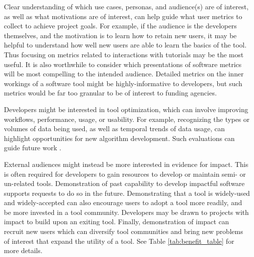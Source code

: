 \documentclass{article}
\begin{document}
Clear understanding of which use cases, personas, and audience(s) are of interest, as well as what motivations are of interest, can help guide what user metrics to collect to achieve project goals. For example, if the audience is the developers themselves, and the motivation is to learn how to retain new users, it may be helpful to understand how well new users are able to learn the basics of the tool. Thus focusing on metrics related to interactions with tutorials may be the most useful. It is also worthwhile to consider which presentations of software metrics will be most compelling to the intended audience. Detailed metrics on the inner workings of a software tool might be highly-informative to developers, but such metrics would be far too granular to be of interest to funding agencies.

Developers might be interested in tool optimization, which can involve improving workflows, performance, usage, or usability. For example, recognizing the types or volumes of data being used, as well as temporal trends of data usage, can highlight opportunities for new algorithm development. Such evaluations can guide future work \cite{fenton2014software}.

External audiences might instead be more interested in evidence for impact. This is often required for developers to gain resources to develop or maintain semi- or un-related tools. Demonstration of past capability to develop impactful software supports requests to do so in the future. Demonstrating that a tool is widely-used and widely-accepted can also encourage users to adopt a tool more readily, and be more invested in a tool community. Developers may be drawn to projects with impact to build upon an exiting tool. Finally, demonstration of impact can recruit new users which can diversify tool communities and bring new problems of interest that expand the utility of a tool. See Table \ref{tab:benefit_table} for more details.
 
\end{document}
